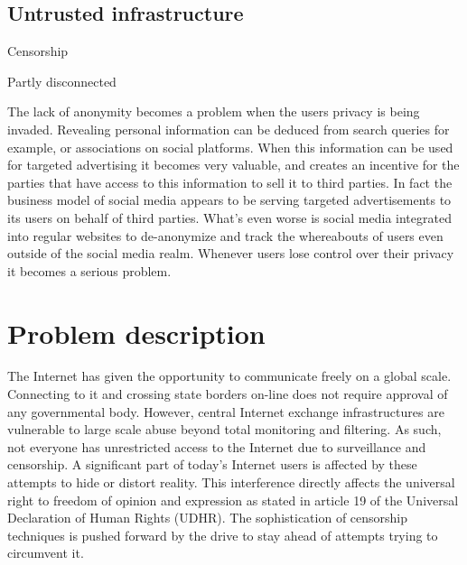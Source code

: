 \section{Untrusted infrastructure}

Censorship

Partly disconnected

The lack of anonymity becomes a problem when the users privacy is being invaded.
Revealing personal information can be deduced from search queries for example, or associations on social platforms.
When this information can be used for targeted advertising it becomes very valuable, and creates an incentive for the parties that have access to this information to sell it to third parties.
In fact the business model of social media appears to be serving targeted advertisements to its users on behalf of third parties.
What's even worse is social media integrated into regular websites to de-anonymize and track the whereabouts of users even outside of the social media realm.
Whenever users lose control over their privacy it becomes a serious problem.


\chapter{Problem description}



The Internet has given the opportunity to communicate freely on a global scale.
Connecting to it and crossing state borders on-line does not require approval of any governmental body.
However, central Internet exchange infrastructures are vulnerable to large scale abuse beyond total monitoring and filtering.
As such, not everyone has unrestricted access to the Internet due to surveillance and censorship.
A significant part of today's Internet users is affected by these attempts to hide or distort reality.
This interference directly affects the universal right to freedom of opinion and expression as stated in article 19 of the Universal Declaration of Human Rights (UDHR).
The sophistication of censorship techniques is pushed forward by the drive to stay ahead of attempts trying to circumvent it.


